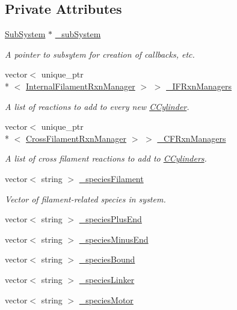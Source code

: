 \subsection*{Private Attributes}
\begin{DoxyCompactItemize}
\item 
\hyperlink{classSubSystem}{Sub\+System} $\ast$ \hyperlink{classSimpleManagerImpl_a3815d1181b7c1a25aca95701dd6d8188}{\+\_\+sub\+System}
\begin{DoxyCompactList}\small\item\em A pointer to subsytem for creation of callbacks, etc. \end{DoxyCompactList}\item 
vector$<$ unique\+\_\+ptr\\*
$<$ \hyperlink{classInternalFilamentRxnManager}{Internal\+Filament\+Rxn\+Manager} $>$ $>$ \hyperlink{classSimpleManagerImpl_a577d86758aa99cd7ebf965872dfce50f}{\+\_\+\+I\+F\+Rxn\+Managers}
\begin{DoxyCompactList}\small\item\em A list of reactions to add to every new \hyperlink{classCCylinder}{C\+Cylinder}. \end{DoxyCompactList}\item 
vector$<$ unique\+\_\+ptr\\*
$<$ \hyperlink{classCrossFilamentRxnManager}{Cross\+Filament\+Rxn\+Manager} $>$ $>$ \hyperlink{classSimpleManagerImpl_a62c7e79906c431487c9c97474c6aab6e}{\+\_\+\+C\+F\+Rxn\+Managers}
\begin{DoxyCompactList}\small\item\em A list of cross filament reactions to add to \hyperlink{classCCylinder}{C\+Cylinders}. \end{DoxyCompactList}\end{DoxyCompactItemize}
{\bf }\par
\begin{DoxyCompactItemize}
\item 
vector$<$ string $>$ \hyperlink{classSimpleManagerImpl_a6842452647356333fa3a8dfc9daad925}{\+\_\+species\+Filament}
\begin{DoxyCompactList}\small\item\em Vector of filament-\/related species in system. \end{DoxyCompactList}\item 
vector$<$ string $>$ \hyperlink{classSimpleManagerImpl_a8c41d3d46a0534a7127d5b863718bcba}{\+\_\+species\+Plus\+End}
\item 
vector$<$ string $>$ \hyperlink{classSimpleManagerImpl_a07794aeec638f61758d22f7ba3b2d5b4}{\+\_\+species\+Minus\+End}
\item 
vector$<$ string $>$ \hyperlink{classSimpleManagerImpl_ad09569aff7c98442037cd4b5e5fd1d4d}{\+\_\+species\+Bound}
\item 
vector$<$ string $>$ \hyperlink{classSimpleManagerImpl_ac5bb2d96109696dcd63109154f88c6be}{\+\_\+species\+Linker}
\item 
vector$<$ string $>$ \hyperlink{classSimpleManagerImpl_a5ff19b12a756eaba341d179b795ed6b4}{\+\_\+species\+Motor}
\end{DoxyCompactItemize}



